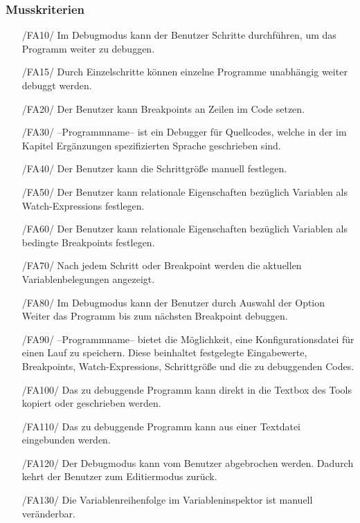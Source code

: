 \documentclass[parskip=full]{scrartcl}
\begin{document}
		\subsubsection{Musskriterien}
		\begin{itemize}
		\item[/FA10/] Im Debugmodus kann der Benutzer Schritte durchführen, um das Programm weiter zu debuggen.
		\item[/FA15/] Durch Einzelschritte können einzelne Programme unabhängig weiter debuggt werden.
		\item[/FA20/] Der Benutzer kann Breakpoints an Zeilen im Code setzen.
		\item[/FA30/] --Programmname-- ist ein Debugger für Quellcodes, welche in der im Kapitel Ergänzungen spezifizierten Sprache geschrieben sind.
		\item[/FA40/] Der Benutzer kann die Schrittgröße manuell festlegen.
		\item[/FA50/] Der Benutzer kann relationale Eigenschaften bezüglich Variablen als Watch-Expressions festlegen.
		\item[/FA60/] Der Benutzer kann relationale Eigenschaften bezüglich Variablen als bedingte Breakpoints festlegen.
		\item[/FA70/] Nach jedem Schritt oder Breakpoint werden die aktuellen Variablenbelegungen angezeigt.
		\item[/FA80/] Im Debugmodus kann der Benutzer durch Auswahl der Option Weiter das Programm bis zum nächsten Breakpoint debuggen.
		\item[/FA90/]--Programmname-- bietet die Möglichkeit, eine Konfigurationsdatei für einen Lauf zu speichern. Diese beinhaltet festgelegte Eingabewerte, Breakpoints, Watch-Expressions, Schrittgröße und die zu debuggenden Codes.
		\item[/FA100/] Das zu debuggende Programm kann direkt in die Textbox des Tools kopiert oder geschrieben werden.
		\item[/FA110/] Das zu debuggende Programm kann aus einer Textdatei eingebunden werden.
		\item[/FA120/] Der Debugmodus kann vom Benutzer abgebrochen werden. Dadurch kehrt der Benutzer zum Editiermodus zurück.
		\item[/FA130/] Die Variablenreihenfolge im Variableninspektor ist manuell veränderbar.
		\end{itemize}
\end{document}
